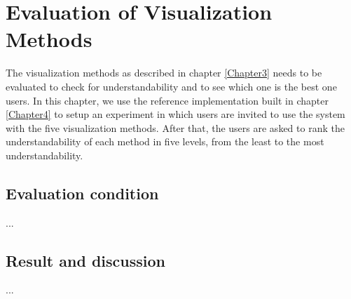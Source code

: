 \chapter{Evaluation of Visualization Methods}
\label{Chapter5}

The visualization methods as described in chapter \ref{Chapter3} needs to be evaluated to check for understandability and to see which one is the best one users. In this chapter, we use the reference implementation built in chapter \ref{Chapter4} to setup an experiment in which users are invited to use the system with the five visualization methods. After that, the users are asked to rank the understandability of each method in five levels, from the least to the most understandability.

\section{Evaluation condition}

...

\section{Result and discussion}

...
